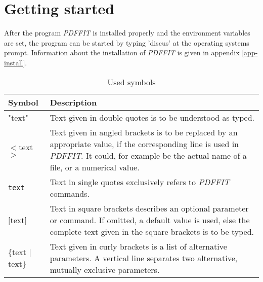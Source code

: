 
\section{Getting started \label{get}}

After the program {\it PDFFIT} is installed properly and the environment
variables are set, the program can be started by typing 'discus' at the
operating systems prompt. Information about the installation of {\it PDFFIT}
is given in appendix \ref{app-install}.

\begin{table}[!tbh]
\centering
\begin{tabularx}{\textwidth}{|p{30mm}|X|}
  \hline
  {\bf Symbol} & {\bf Description} \\
  \hline\hline
  "text"     &  Text given in double quotes is to be understood as typed. \\
  \hline
  $<$text$>$ &  Text given in angled brackets is to be replaced by an
                appropriate value, if the corresponding line is used
                in {\it PDFFIT}. It could, for example be the actual name
                of a file, or a numerical value. \\
  \hline
  {\tt text} &  Text in single quotes exclusively refers to {\it PDFFIT}
                commands. \\
  \hline
  $[$text$]$ &  Text in square brackets describes an optional parameter or
                command. If omitted, a default value is used, else
                the complete text given in the square brackets is to
                be typed. \\
  \hline
  \{text $|$ text\} &  Text given in curly brackets is a list of alternative
                parameters. A vertical line separates two alternative,
                mutually exclusive parameters. \\
  \hline
\end{tabularx}
\caption{\label{sym-tab}Used symbols}
\end{table}

